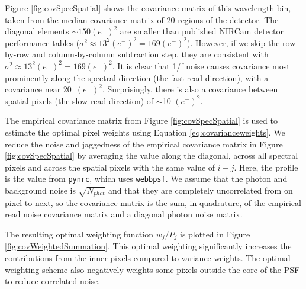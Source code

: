 \documentclass[]{aastex62}
\begin{document}
Figure \ref{fig:covSpecSpatial} shows the covariance matrix of this wavelength bin, taken from the median covariance matrix of 20 regions of the detector.
The diagonal elements $\sim 150 (e^-)^2$ are smaller than published NIRCam detector performance tables ($\sigma^2 \approx 13^2 (e^-)^2=169 (e^-)^2$).
However, if we skip the row-by-row and column-by-column subtraction step, they are consistent with $\sigma^2 \approx 13^2 (e^-)^2=169 (e^-)^2$.
It is clear that 1/f noise causes covariance most prominently along the spectral direction (the fast-read direction), with a covariance near 20~$(e^-)^2$.
Surprisingly, there is also a covariance between spatial pixels (the slow read direction) of $\sim$10 $(e^-)^2$.




The empirical covariance matrix from Figure \ref{fig:covSpecSpatial} is used to estimate the optimal pixel weights using Equation \ref{eq:covarianceweights}.
We reduce the noise and jaggedness of the empirical covariance matrix in Figure \ref{fig:covSpecSpatial} by averaging the value along the diagonal, across all spectral pixels and across the spatial pixels with the same value of $i -j$.
Here, the profile is the value from \texttt{pynrc}, which uses \texttt{webbpsf}.
We assume that the photon and background noise is $\sqrt{N_{phot}}$ and that they are completely uncorrelated from on pixel to next, so the covariance matrix is the sum, in quadrature, of the empirical read noise covariance matrix and a diagonal photon noise matrix.

The resulting optimal weighting function $w_j/P_j$ is plotted in Figure \ref{fig:covWeightedSummation}.
This optimal weighting significantly increases the contributions from the inner pixels compared to variance weights.
The optimal weighting scheme also negatively weights some pixels outside the core of the PSF to reduce correlated noise.
\end{document}
